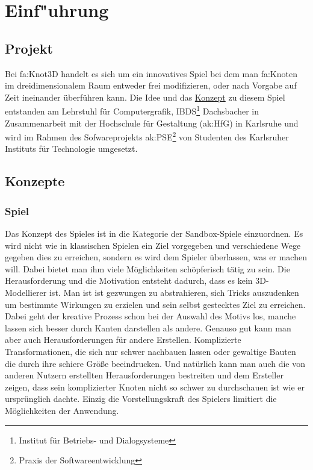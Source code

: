 %
%


\chapter{Einf{"u}hrung}
\label{EF}


\section{Projekt}

Bei \gls{fa:Knot3D} handelt es sich um ein innovatives Spiel bei dem man \gls{fa:Knoten} im dreidimensionalem Raum entweder frei modifizieren, oder nach Vorgabe auf Zeit ineinander überführen kann.
Die Idee und das \hyperlink{EF:Spielkonzept}{Konzept} zu diesem Spiel entstanden am Lehrstuhl für Computergrafik, IBDS\footnote{Institut für Betriebs- und Dialogsysteme} Dachsbacher in Zusammenarbeit mit der Hochschule für Gestaltung (\gls{ak:HfG}) in Karlsruhe und wird im Rahmen des Sofwareprojekts \gls{ak:PSE}\footnote{Praxis der Softwareentwicklung} von Studenten des Karlsruher Instituts für Technologie umgesetzt.


\section{Konzepte}
\label{EF:Konzepte}

\subsection{Spiel}
\label{EF:Spielkonzept}

Das Konzept des Spieles ist in die Kategorie der Sandbox-Spiele einzuordnen. Es wird nicht wie in klassischen Spielen ein Ziel vorgegeben und verschiedene Wege gegeben dies zu erreichen, sondern es wird dem Spieler überlassen, was er machen will. Dabei bietet man ihm viele Möglichkeiten schöpferisch tätig zu sein. Die Herausforderung und die Motivation entsteht dadurch, dass es kein 3D-Modellierer ist. Man ist ist gezwungen zu abstrahieren, sich Tricks auszudenken um bestimmte Wirkungen zu erzielen und sein selbst gestecktes Ziel zu erreichen. Dabei geht der kreative Prozess schon bei der Auswahl des Motivs los, manche lassen sich besser durch Kanten darstellen als andere.
Genauso gut kann man aber auch Herausforderungen für andere Erstellen. Komplizierte Transformationen, die sich nur schwer nachbauen lassen oder gewaltige Bauten die durch ihre schiere Größe beeindrucken. Und natürlich kann man auch die von anderen Nutzern erstellten Herausforderungen bestreiten und dem Ersteller zeigen, dass sein komplizierter Knoten nicht so schwer zu durchschauen ist wie er ursprünglich dachte.
Einzig die Vorstellungskraft des Spielers limitiert die Möglichkeiten der Anwendung.


